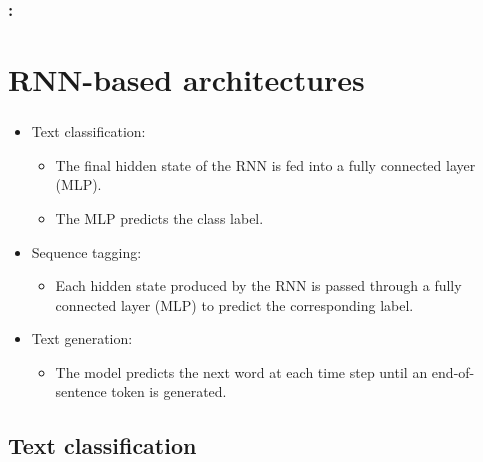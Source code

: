 \documentclass[xcolor=table]{beamer}
\begin{document}
\begin{frame}
	\frametitle{\insertshortsubtitle: \insertsection}
	\framesubtitle{\insertsubsection}
	
	
\end{frame}


\section{RNN-based architectures}

\begin{frame}
	\frametitle{\insertshortsubtitle}
	\framesubtitle{\insertsection}
	
	\begin{itemize}
		\item Text classification:
		\begin{itemize}
			\item The final hidden state of the RNN is fed into a fully connected layer (MLP).
			\item The MLP predicts the class label.
		\end{itemize}
		
		\item Sequence tagging:
		\begin{itemize}
			\item Each hidden state produced by the RNN is passed through a fully connected layer (MLP) to predict the corresponding label.
		\end{itemize}
		
		\item Text generation:
		\begin{itemize}
			\item The model predicts the next word at each time step until an end-of-sentence token is generated.
		\end{itemize}
	\end{itemize}
	
	
\end{frame}

\subsection{Text classification}
\end{document}

